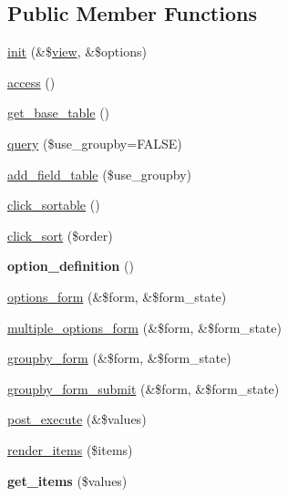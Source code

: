 \subsection*{Public Member Functions}
\begin{DoxyCompactItemize}
\item 
\hyperlink{classviews__handler__field__field_ad700213e1c6ed422441db57cf58f47c6}{init} (\&\$\hyperlink{classview}{view}, \&\$options)
\item 
\hyperlink{classviews__handler__field__field_adf074793dec71e06e0512d16415ff91b}{access} ()
\item 
\hyperlink{classviews__handler__field__field_a06b5818f58f0a9edaeadc085186eb2a6}{get\_\-base\_\-table} ()
\item 
\hyperlink{classviews__handler__field__field_a17122cc581a8411708059011a6db180d}{query} (\$use\_\-groupby=FALSE)
\item 
\hyperlink{classviews__handler__field__field_ac42485c9db18b8b61ee25133505975c5}{add\_\-field\_\-table} (\$use\_\-groupby)
\item 
\hyperlink{classviews__handler__field__field_a02da80b019b7cfeb7d00571b7b2b8b6d}{click\_\-sortable} ()
\item 
\hyperlink{classviews__handler__field__field_aaded59c09fb313c01398a7652d92ae0d}{click\_\-sort} (\$order)
\item 
\hypertarget{classviews__handler__field__field_a60414b9383a8f59d58481f226319d317}{
{\bfseries option\_\-definition} ()}
\label{classviews__handler__field__field_a60414b9383a8f59d58481f226319d317}

\item 
\hyperlink{classviews__handler__field__field_a2548b1c9e1940efd2e12bf4702cdb3fb}{options\_\-form} (\&\$form, \&\$form\_\-state)
\item 
\hyperlink{classviews__handler__field__field_aab581f18035fc79e759600f48f9dc179}{multiple\_\-options\_\-form} (\&\$form, \&\$form\_\-state)
\item 
\hyperlink{classviews__handler__field__field_a9bd5f09dbd4498880d106ff9d7d1b967}{groupby\_\-form} (\&\$form, \&\$form\_\-state)
\item 
\hyperlink{classviews__handler__field__field_a2ff4444b58879ac73fefcfcff43f3d0e}{groupby\_\-form\_\-submit} (\&\$form, \&\$form\_\-state)
\item 
\hyperlink{classviews__handler__field__field_ad28ba30ac4cccf41187e702258883681}{post\_\-execute} (\&\$values)
\item 
\hyperlink{classviews__handler__field__field_aa2206b6422041cc4e82c8091a5c28f15}{render\_\-items} (\$items)
\item 
\hypertarget{classviews__handler__field__field_ade01c1fa1a56b5383e68d19cb8624542}{
{\bfseries get\_\-items} (\$values)}
\label{classviews__handler__field__field_ade01c1fa1a56b5383e68d19cb8624542}


\end{DoxyCompactItemize}
